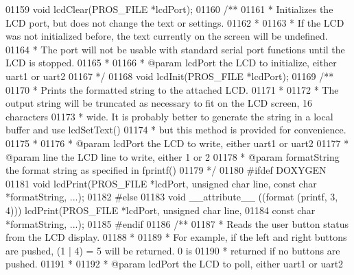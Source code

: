 \begin{DoxyCode}
{{{{{{{{{01159 \textcolor{keywordtype}{void} lcdClear(PROS_FILE *lcdPort);
01160 \textcolor{comment}{/**}
01161 \textcolor{comment}{ * Initializes the LCD port, but does not change the text or settings.}
01162 \textcolor{comment}{ *}
01163 \textcolor{comment}{ * If the LCD was not initialized before, the text currently on the screen will be undefined.}
01164 \textcolor{comment}{ * The port will not be usable with standard serial port functions until the LCD is stopped.}
01165 \textcolor{comment}{ *}
01166 \textcolor{comment}{ * @param lcdPort the LCD to initialize, either uart1 or uart2}
01167 \textcolor{comment}{ */}
01168 \textcolor{keywordtype}{void} lcdInit(PROS_FILE *lcdPort);
01169 \textcolor{comment}{/**}
01170 \textcolor{comment}{ * Prints the formatted string to the attached LCD.}
01171 \textcolor{comment}{ *}
01172 \textcolor{comment}{ * The output string will be truncated as necessary to fit on the LCD screen, 16 characters}
01173 \textcolor{comment}{ * wide. It is probably better to generate the string in a local buffer and use lcdSetText()}
01174 \textcolor{comment}{ * but this method is provided for convenience.}
01175 \textcolor{comment}{ *}
01176 \textcolor{comment}{ * @param lcdPort the LCD to write, either uart1 or uart2}
01177 \textcolor{comment}{ * @param line the LCD line to write, either 1 or 2}
01178 \textcolor{comment}{ * @param formatString the format string as specified in fprintf()}
01179 \textcolor{comment}{ */}
01180 \textcolor{preprocessor}{#}\textcolor{preprocessor}{ifdef} \textcolor{preprocessor}{DOXYGEN}
01181 \textcolor{keywordtype}{void} lcdPrint(PROS\_FILE *lcdPort, \textcolor{keywordtype}{unsigned} \textcolor{keywordtype}{char} line, \textcolor{keyword}{const} \textcolor{keywordtype}{char} *formatString, ...);
01182 \textcolor{preprocessor}{#}\textcolor{preprocessor}{else}
01183 \textcolor{keywordtype}{void} \textcolor{keyword}{\_\_attribute\_\_} ((format (printf, 3, 4))) lcdPrint(PROS_FILE *lcdPort, \textcolor{keywordtype}{unsigned} \textcolor{keywordtype}{char} line,
01184        \textcolor{keyword}{const} \textcolor{keywordtype}{char} *formatString, ...);
01185 \textcolor{preprocessor}{#}\textcolor{preprocessor}{endif}
01186 \textcolor{comment}{/**}
01187 \textcolor{comment}{ * Reads the user button status from the LCD display.}
01188 \textcolor{comment}{ *}
01189 \textcolor{comment}{ * For example, if the left and right buttons are pushed, (1 | 4) = 5 will be returned. 0 is}
01190 \textcolor{comment}{ * returned if no buttons are pushed.}
01191 \textcolor{comment}{ *}
01192 \textcolor{comment}{ * @param lcdPort the LCD to poll, either uart1 or uart2}
}}}}}}}}}
\end{DoxyCode}
